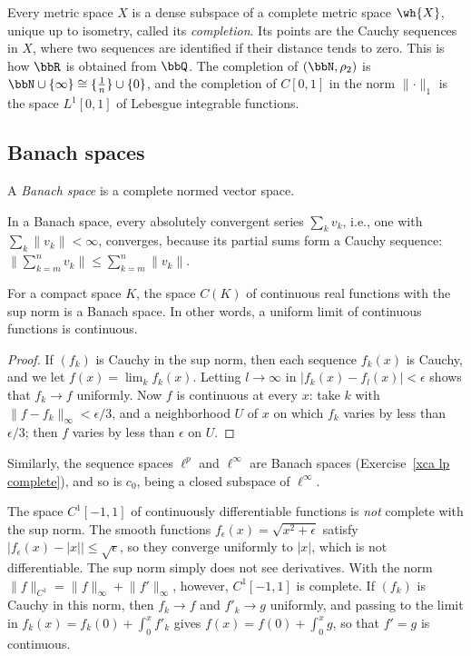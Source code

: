 \begin{rem}[Completion]
    Every metric space $X$ is a dense subspace of a complete metric space $\wh{X}$, unique up to isometry, called its \emph{completion}. Its points are the Cauchy sequences in $X$, where two sequences are identified if their distance tends to zero. This is how $\bbR$ is obtained from $\bbQ$. The completion of $(\bbN,\rho_2)$ is $\bbN\cup\{\infty\}\cong\{\frac1n\}\cup\{0\}$, and the completion of $C[0,1]$ in the norm $\lVert\cdot\rVert_1$ is the space $L^1[0,1]$ of Lebesgue integrable functions.
\end{rem}

\subsection{Banach spaces}

\begin{defn}
    A \emph{Banach space} is a complete normed vector space.
\end{defn}

In a Banach space, every absolutely convergent series $\sum_kv_k$, i.e., one with $\sum_k\lVert v_k\rVert<\infty$, converges, because its partial sums form a Cauchy sequence: $\lVert\sum_{k=m}^nv_k\rVert\leq\sum_{k=m}^n\lVert v_k\rVert$.

\begin{prop}\label{prop C(K) complete}
    For a compact space $K$, the space $C(K)$ of continuous real functions with the sup norm is a Banach space. In other words, a uniform limit of continuous functions is continuous.
\end{prop}
\begin{proof}
    If $(f_k)$ is Cauchy in the sup norm, then each sequence $f_k(x)$ is Cauchy, and we let $f(x)=\lim_kf_k(x)$. Letting $l\to\infty$ in $\lvert f_k(x)-f_l(x)\rvert<\epsilon$ shows that $f_k\to f$ uniformly. Now $f$ is continuous at every $x$: take $k$ with $\lVert f-f_k\rVert_\infty<\epsilon/3$, and a neighborhood $U$ of $x$ on which $f_k$ varies by less than $\epsilon/3$; then $f$ varies by less than $\epsilon$ on $U$.
\end{proof}

Similarly, the sequence spaces $\ell^p$ and $\ell^\infty$ are Banach spaces (Exercise~\ref{xca lp complete}), and so is $c_0$, being a closed subspace of $\ell^\infty$.

\begin{example}\label{example C1 norm}
    The space $C^1[-1,1]$ of continuously differentiable functions is \emph{not} complete with the sup norm. The smooth functions $f_\epsilon(x)=\sqrt{x^2+\epsilon}$ satisfy $\lvert f_\epsilon(x)-\lvert x\rvert\rvert\leq\sqrt\epsilon$, so they converge uniformly to $\lvert x\rvert$, which is not differentiable. The sup norm simply does not see derivatives. With the norm $\lVert f\rVert_{C^1}=\lVert f\rVert_\infty+\lVert f'\rVert_\infty$, however, $C^1[-1,1]$ is complete. If $(f_k)$ is Cauchy in this norm, then $f_k\to f$ and $f'_k\to g$ uniformly, and passing to the limit in $f_k(x)=f_k(0)+\int_0^xf'_k$ gives $f(x)=f(0)+\int_0^xg$, so that $f'=g$ is continuous.
\end{example}

